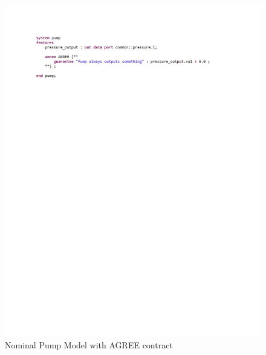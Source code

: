 \begin{figure}[h!]
	\begin{center}
		\includegraphics[trim=30 600 0 30,clip,width=1.0\dimexpr\textwidth-1.5cm\relax]{images/nominalPump.pdf}
		\caption{Nominal Pump Model with AGREE contract}
		\label{fig:nominalPump}
	\end{center}
\end{figure}

